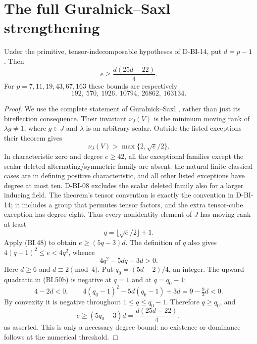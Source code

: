 \section{The full Guralnick--Saxl strengthening}
\label{sec:scalar-unramified-radical}

\begin{corollary}
Under the primitive, tensor-indecomposable hypotheses of D-BI-14,
put $d=p-1$.  Then
\[
                       e\ge\frac{d(25d-22)}4.              \tag{BI.50a}
\]
For $p=7,11,19,43,67,163$ these bounds are respectively
\[
              192,\ 570,\ 1926,\ 10794,\ 26862,\ 163134.
\]
\end{corollary}
\begin{proof}
We use the complete statement of Guralnick--Saxl
\cite[Theorem~7.1 and Remark~(3), pp.~548--549;
Lemma~7.4, pp.~550--551]{BI:GS}, rather
than just its bireflection consequence.  Their invariant
$\nu_J(V)$ is the minimum moving rank of $\lambda g\ne1$,
where $g\in J$ and $\lambda$ is an arbitrary scalar.
Outside the listed exceptions their theorem gives
\[
                    \nu_J(V)>\max\{2,\sqrt e/2\}.
\]
In characteristic zero and degree $e\ge42$, all the exceptional
families except the scalar deleted alternating/symmetric family
are absent: the natural finite classical cases are in defining
positive characteristic, and all other listed exceptions have
degree at most ten.  D-BI-08 excludes the scalar deleted family
also for a larger inducing field.  The theorem's tensor convention
is exactly the convention in D-BI-14; it includes a group that
permutes tensor factors, and the extra tensor-cube exception has
degree eight.  Thus every nonidentity element of $J$ has moving
rank at least
\[
                        q=\lfloor\sqrt e/2\rfloor+1.
\]
Apply (BI.48) to obtain $e\ge(5q-3)d$.  The definition of $q$
also gives $4(q-1)^2\le e<4q^2$, whence
\[
                         4q^2-5dq+3d>0.                  \tag{BI.50b}
\]
Here $d\ge6$ and $d\equiv2\pmod4$.  Put
$q_0=(5d-2)/4$, an integer.  The upward quadratic in (BI.50b)
is negative at $q=1$ and at $q=q_0-1$:
\[
 4-2d<0,\qquad
 4(q_0-1)^2-5d(q_0-1)+3d=9-\tfrac92d<0.
\]
By convexity it is negative throughout $1\le q\le q_0-1$.
Therefore $q\ge q_0$, and
\[
           e\ge(5q_0-3)d=\frac{d(25d-22)}4,
\]
as asserted.  This is only a necessary degree bound: no existence
or dominance follows at the numerical threshold.
\end{proof}

